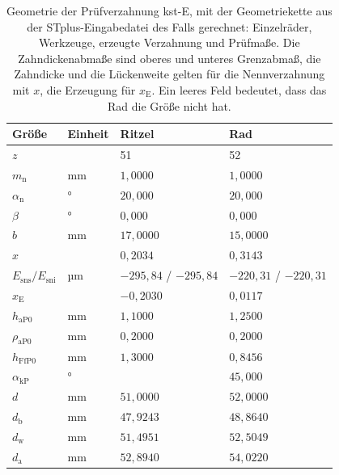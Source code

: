 \begin{table}[htbp]
    \caption{Geometrie der Prüfverzahnung kst-E, mit der Geometriekette aus der STplus-Eingabedatei des Falls gerechnet: Einzelräder, Werkzeuge, erzeugte Verzahnung und Prüfmaße. Die Zahndickenabmaße sind oberes und unteres Grenzabmaß, die Zahndicke und die Lückenweite gelten für die Nennverzahnung mit $x$, die Erzeugung für $x_{\mathrm{E}}$. Ein leeres Feld bedeutet, dass das Rad die Größe nicht hat.}
    \label{tab:anhang_geometrie_kste}
    \centering
    \footnotesize
    \setlength{\tabcolsep}{4pt}
    \begin{tabular}{L{6.2cm}lll}
        Größe & Einheit & Ritzel & Rad \\
        \hline
        $z$ &  & 51 & 52 \\
        \hline
        $m_{\mathrm{n}}$ & mm & $1{,}0000$ & $1{,}0000$ \\
        \hline
        $\alpha_{\mathrm{n}}$ & ° & $20{,}000$ & $20{,}000$ \\
        \hline
        $\beta$ & ° & $0{,}000$ & $0{,}000$ \\
        \hline
        $b$ & mm & $17{,}0000$ & $15{,}0000$ \\
        \hline
        $x$ &  & $0{,}2034$ & $0{,}3143$ \\
        \hline
        $E_{\mathrm{sns}} / E_{\mathrm{sni}}$ & µm & $-295{,}84$ / $-295{,}84$ & $-220{,}31$ / $-220{,}31$ \\
        \hline
        $x_{\mathrm{E}}$ &  & $-0{,}2030$ & $0{,}0117$ \\
        \hline
        $h_{\mathrm{aP0}}$ & mm & $1{,}1000$ & $1{,}2500$ \\
        \hline
        $\rho_{\mathrm{aP0}}$ & mm & $0{,}2000$ & $0{,}2000$ \\
        \hline
        $h_{\mathrm{FfP0}}$ & mm & $1{,}3000$ & $0{,}8456$ \\
        \hline
        $\alpha_{\mathrm{kP}}$ & ° &  & $45{,}000$ \\
        \hline
        $d$ & mm & $51{,}0000$ & $52{,}0000$ \\
        \hline
        $d_{\mathrm{b}}$ & mm & $47{,}9243$ & $48{,}8640$ \\
        \hline
        $d_{\mathrm{w}}$ & mm & $51{,}4951$ & $52{,}5049$ \\
        \hline
        $d_{\mathrm{a}}$ & mm & $52{,}8940$ & $54{,}0220$ \\

\end{tabular}
\end{table}

